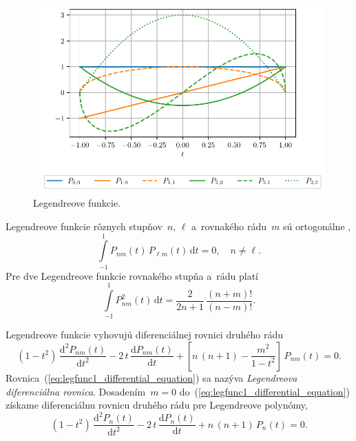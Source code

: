 \documentclass[a4paper, 12pt]{book}
\newcommand{\diff}{\mathrm d}
\begin{document}
\begin{figure}[bt]
\centering
\includegraphics{./fig-legendre-functions.pdf}
\caption{Legendreove funkcie.}
\label{fig:lf}
\end{figure}

Legendreove funkcie rôznych stupňov~$n$, $\ell$ a~rovnakého rádu~$m$ sú
ortogonálne \parencite{Freeden2009},
%
\begin{equation}
\label{eq:pnm_orthogonality}
\int\limits_{-1}^{1} P_{nm}(t) \, P_{\ell m}(t) \, \diff t = 0{,} \quad n \neq 
\ell{.}
\end{equation}
%
Pre dve Legendreove funkcie rovnakého stupňa a~rádu platí
\begin{equation}
\label{eq:pnm_times_pnm}
\int\limits_{-1}^{1} P^2_{nm}(t) \, \diff t = \frac{2}{2n + 1} \, \frac{(n 
+ m)!}{(n - m)!}{.}
\end{equation}

Legendreove funkcie vyhovujú diferenciálnej rovnici druhého rádu 
\parencite{SansoGeoidDetermination}
%
\begin{equation}
\label{eq:legfunc1_differential_equation}
(1 - t^2) \, \frac{\diff^2 P_{nm}(t)}{\diff t^2} - 2 \, t \, \frac{\diff 
P_{nm}(t)}{\diff t} + \left[ n \, (n + 1) - \frac{m^2}{1 - t^2} \right] \, 
P_{nm}(t) = 0{.}
\end{equation}
%
Rovnica~(\ref{eq:legfunc1_differential_equation}) sa nazýva \emph{Legendreova 
diferenciálna rovnica}.  Dosadením~$m = 0$ 
do~(\ref{eq:legfunc1_differential_equation}) získame diferenciálnu rovnicu 
druhého rádu pre Legendreove polynómy,
%
\begin{equation}
\label{eq:legpol_differential_equation}
(1 - t^2) \, \frac{\diff^2 P_n(t)}{\diff t^2} - 2 \, t \, \frac{\diff 
P_n(t)}{\diff t} + n \, (n + 1) \, P_n(t) = 0{.}
\end{equation}
\end{document}
